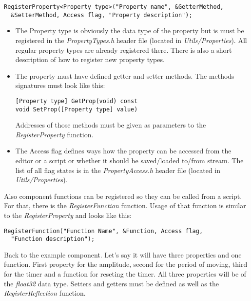 \documentclass[a4paper, 12pt]{report}
\begin{document}
\footnotesize 
\begin{verbatim}
RegisterProperty<Property type>("Property name", &GetterMethod, 
  &SetterMethod, Access flag, "Property description");
\end{verbatim}
\normalsize

\begin{itemize}
\item
The Property type is obviously the data type of the property but is must be registered in the \emph{PropertyTypes.h} header file (located in \emph{Utils/Properties}). All regular property types are already registered there. There is also a short description of how to register new property types.

\item
The property must have defined getter and setter methods. The methods signatures must look like this:

\footnotesize 
\begin{verbatim}
[Property type] GetProp(void) const
void SetProp([Property type] value)
\end{verbatim}
\normalsize

Addresses of those methods must be given as parameters to the \emph{RegisterProperty} function.

\item
The Access flag defines ways how the property can be accessed from the editor or a script or whether it should be saved/loaded to/from stream. The list of all flag states is in the \emph{PropertyAccess.h} header file (located in \emph{Utils/Properties}).
\end{itemize}

Also component functions can be registered so they can be called from a script. For that, there is the \emph{RegisterFunction} function. Usage of that function is similar to the \emph{RegisterProperty} and looks like this:

\footnotesize 
\begin{verbatim}
RegisterFunction("Function Name", &Function, Access flag,
  "Function description");
\end{verbatim}
\normalsize

Back to the example component. Let's say it will have three properties and one function. First property for the amplitude, second for the period of moving, third for the timer and a function for reseting the timer. All three properties will be of the \emph{float32} data type. Setters and getters must be defined as well as the \emph{RegisterReflection} function. 
\end{document}
